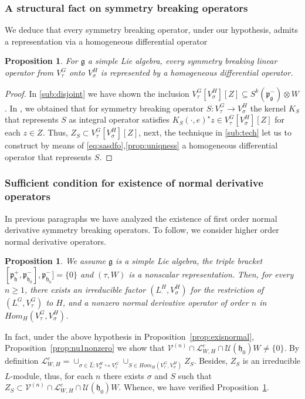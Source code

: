 \documentclass[12pt]{amsart}
\newtheorem{prop}[thm]{Proposition}
\theoremstyle{definition}
\theoremstyle{remark}
\newcommand{\g}{\mathfrak{g}}
\newcommand{\h}{\mathfrak{h}}
\newcommand{\p}{\mathfrak p}
\numberwithin{equation}{section}
\begin{document}
\subsubsection{A structural fact on symmetry breaking operators}
 We deduce that every symmetry breaking operator, under our hypothesis, admits a representation via a homogeneous differential operator
 \begin{prop}\label{prop:diffarehomo}For $\g$ a simple Lie algebra, every symmetry breaking linear operator from $V_\tau^G$ onto $V_\sigma^H$ is represented by a homogeneous differential operator.
 \end{prop}
 \begin{proof}In \ref{sub:disjoint} we have shown the inclusion $V_\tau^G [V_\sigma^H][Z]\subseteq S^k(\p_\g^-)\otimes W$. In \cite[Lemma 4.2]{OV2},\cite{OV4} we obtained that for symmetry breaking operator $ S: V_\tau^G \rightarrow V_\sigma^H$ the kernel $K_S$ that represents $S$ as integral operator satisfies $K_S(\cdot, e)^\star z \in V_\tau^G [V_\sigma^H][Z]$ for each $z\in Z$. Thus, $Z_S \subset V_\tau^G [V_\sigma^H][Z]$, next,   the technique in \ref{sub:tech} let us to construct  by means of  \ref{eq:sasdfo},\ref{prop:uniqness} a homogeneous differential operator that represents $S$.
 \end{proof}

\subsubsection{Sufficient condition for existence of normal derivative operators} In previous paragraphs we have analyzed the existence of first order normal derivative symmetry breaking operators. To follow, we consider higher order normal derivative operators.
\begin{prop}\label{prop:existencenormal2} We assume $\g$ is a simple Lie algebra, the triple bracket $[\p_\h^+, \p_{\h_0}^-],\p_{\h_0}^-] =\{0\}$ and $(\tau, W)$ is a nonscalar representation. Then, for every $n\geq 1$,  there exists an irreducible factor $(L_\cdot^H, V_\sigma^H)$ for the restriction   of $(L_\cdot^G,   V_\tau^G) $ to $H$, and a nonzero normal derivative operator  of order $n$ in $Hom_H( V_\tau^G, V_\sigma^H)$.
\end{prop}

In fact, under the above hypothesis in Proposition~\ref{prop:exisnormal}, Proposition~\ref{prop:nu1nonzero} we show that $\mathcal V^{(n)}\cap \mathcal  L_{W,H}^c \cap \mathcal U(\h_0)W \not= \{0\}$. By definition $\mathcal L_{W,H}^c=\cup_{\sigma \in \hat L: V_\sigma^H \hookrightarrow V_\tau^G} \cup_{S \in Hom_H( V_\tau^G, V_\sigma^H)}  Z_S$. Besides, $Z_S$ is an irreducible $L$-module, thus, for each $n$ there exists $\sigma$ and $S$ such that $Z_S \subset \mathcal V^{(n)}\cap \mathcal  L_{W,H}^c \cap \mathcal U(\h_0)W$. Whence, we have verified   Proposition~\ref{prop:existencenormal2}.
\end{document}
